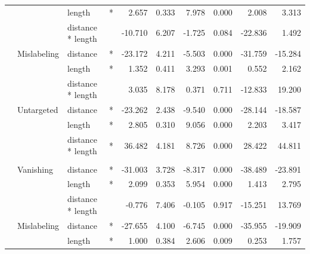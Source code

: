 \begin{longtable}[t]{llllrrrrrr}
\hspace{1em} &  & length & * & 2.657 & 0.333 & 7.978 & 0.000 & 2.008 & 3.313\\
\cmidrule{3-10}\nopagebreak
\hspace{1em} &  & distance * length &  & -10.710 & 6.207 & -1.725 & 0.084 & -22.836 & 1.492\\
\cmidrule{2-10}\nopagebreak
\hspace{1em} & Mislabeling & distance & * & -23.172 & 4.211 & -5.503 & 0.000 & -31.759 & -15.284\\
\cmidrule{3-10}\nopagebreak
\hspace{1em} &  & length & * & 1.352 & 0.411 & 3.293 & 0.001 & 0.552 & 2.162\\
\cmidrule{3-10}\nopagebreak
\hspace{1em} &  & distance * length &  & 3.035 & 8.178 & 0.371 & 0.711 & -12.833 & 19.200\\
\cmidrule{2-10}\nopagebreak
\hspace{1em} & Untargeted & distance & * & -23.262 & 2.438 & -9.540 & 0.000 & -28.144 & -18.587\\
\cmidrule{3-10}\nopagebreak
\hspace{1em} &  & length & * & 2.805 & 0.310 & 9.056 & 0.000 & 2.203 & 3.417\\
\cmidrule{3-10}\nopagebreak
\hspace{1em} &  & distance * length & * & 36.482 & 4.181 & 8.726 & 0.000 & 28.422 & 44.811\\
\cmidrule{1-10}\pagebreak[0]
\addlinespace[0.3em]
\multicolumn{10}{l}{\textbf{Faster R-CNN}}\\
\hspace{1em} & Vanishing & distance & * & -31.003 & 3.728 & -8.317 & 0.000 & -38.489 & -23.891\\
\cmidrule{3-10}\nopagebreak
\hspace{1em} &  & length & * & 2.099 & 0.353 & 5.954 & 0.000 & 1.413 & 2.795\\
\cmidrule{3-10}\nopagebreak
\hspace{1em} &  & distance * length &  & -0.776 & 7.406 & -0.105 & 0.917 & -15.251 & 13.769\\
\cmidrule{2-10}\nopagebreak
\hspace{1em} & Mislabeling & distance & * & -27.655 & 4.100 & -6.745 & 0.000 & -35.955 & -19.909\\
\cmidrule{3-10}\nopagebreak
\hspace{1em} &  & length & * & 1.000 & 0.384 & 2.606 & 0.009 & 0.253 & 1.757\\

\end{longtable}
